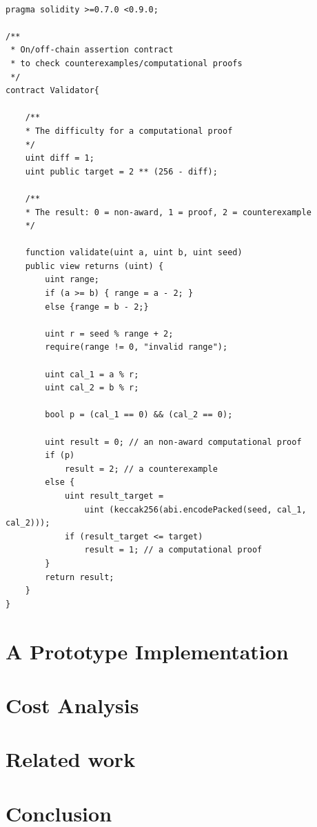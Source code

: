 \documentclass[runningheads]{llncs}
\begin{document}
\begin{lstlisting}[numbers=none]

pragma solidity >=0.7.0 <0.9.0;

/**
 * On/off-chain assertion contract 
 * to check counterexamples/computational proofs
 */
contract Validator{

    /**
    * The difficulty for a computational proof
    */
    uint diff = 1;
    uint public target = 2 ** (256 - diff); 

    /**
    * The result: 0 = non-award, 1 = proof, 2 = counterexample
    */

    function validate(uint a, uint b, uint seed)
    public view returns (uint) {
        uint range;
        if (a >= b) { range = a - 2; }
        else {range = b - 2;}
        
        uint r = seed % range + 2;
        require(range != 0, "invalid range");

        uint cal_1 = a % r;
        uint cal_2 = b % r;
        
        bool p = (cal_1 == 0) && (cal_2 == 0);

        uint result = 0; // an non-award computational proof 
        if (p)  
            result = 2; // a counterexample
        else {
            uint result_target = 
                uint (keccak256(abi.encodePacked(seed, cal_1, cal_2)));
            if (result_target <= target) 
                result = 1; // a computational proof      
        }              
        return result;           
    }
}

\end{lstlisting}

\section{A Prototype Implementation}
\section{Cost Analysis}
\section{Related work}
\section{Conclusion}

\newpage
{}


\newpage


\end{document}
